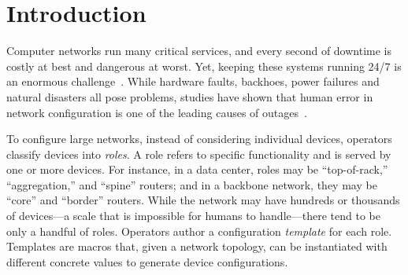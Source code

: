 \documentclass[numbers, 10pt, preprint]{sigplanconf}
\begin{document}
%
%
%
%



%
%
%
%

\section{Introduction} \label{sec:introduction}




Computer networks run many critical services, and every second of downtime is
costly at best and dangerous at worst.  Yet, keeping these systems
running 24/7 is an enormous
challenge~\cite{mahajan+:bgp-misconfiguration,feamster+:rcc,batfish,dc-failure-study}.
%
While hardware faults, backhoes, power failures and natural disasters all pose
problems, studies have shown that human error in network
configuration is one of the leading causes of
outages~\cite{juniper-study,yankee-study}.

To configure large networks, instead of considering individual
devices, operators classify devices into {\em roles}. A role refers to
specific functionality and is served by one or more devices. For instance, in a
data center, roles may be ``top-of-rack,'' ``aggregation,'' and ``spine''
routers; and in a backbone network, they may be ``core'' and ``border''
routers. While the network may have hundreds or thousands of devices---a scale
that is impossible for humans to handle---there tend to be only a handful of roles.
%
Operators author a configuration {\em template} for each role. Templates are
macros that, given a network topology, can be instantiated with different concrete values to generate device configurations.
\end{document}
